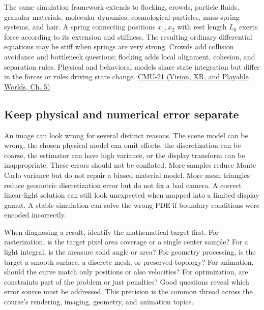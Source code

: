 The same simulation framework extends to flocking, crowds, particle fluids, granular materials, molecular dynamics, cosmological particles, mass-spring systems, and hair. A spring connecting positions \(x_1,x_2\) with rest length \(L_0\) exerts force according to its extension and stiffness. The resulting ordinary differential equations may be stiff when springs are very strong. Crowds add collision avoidance and bottleneck questions; flocking adds local alignment, cohesion, and separation rules. Physical and behavioral models share state integration but differ in the forces or rules driving state change. \href{../07-Vision-XR-and-Playable-Worlds/main.pdf\#nameddest=04-visual-computing-ii-ch036-cmu-21---dynamics-and-time-integration}{CMU-21 (Vision, XR, and Playable Worlds, Ch. 5)}

\subsection{Keep physical and numerical error separate}\label{04-visual-computing-ii-ch029-keep-physical-and-numerical-error-separate}

\hypertarget{04-visual-computing-ii-ch029-keep-physical-and-numerical-error-separate}{}

An image can look wrong for several distinct reasons. The scene model can be wrong, the chosen physical model can omit effects, the discretization can be coarse, the estimator can have high variance, or the display transform can be inappropriate. These errors should not be conflated. More samples reduce Monte Carlo variance but do not repair a biased material model. More mesh triangles reduce geometric discretization error but do not fix a bad camera. A correct linear-light solution can still look unexpected when mapped into a limited display gamut. A stable simulation can solve the wrong PDE if boundary conditions were encoded incorrectly.

When diagnosing a result, identify the mathematical target first. For rasterization, is the target pixel area coverage or a single center sample? For a light integral, is the measure solid angle or area? For geometry processing, is the target a smooth surface, a discrete mesh, or preserved topology? For animation, should the curve match only positions or also velocities? For optimization, are constraints part of the problem or just penalties? Good questions reveal which error source must be addressed. This precision is the common thread across the course's rendering, imaging, geometry, and animation topics.

